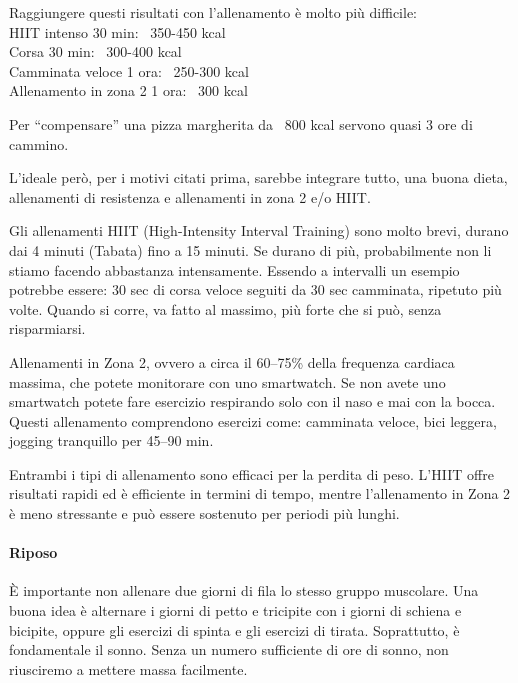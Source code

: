 \documentclass[12pt]{book} %
\begin{document}
Raggiungere questi risultati con l'allenamento è molto più difficile:\\
HIIT intenso 30 min: ~350-450 kcal\\
Corsa 30 min: ~300-400 kcal\\
Camminata veloce 1 ora: ~250-300 kcal\\
Allenamento in zona 2 1 ora: ~300 kcal

Per “compensare” una pizza margherita da ~800 kcal servono quasi 3 ore di cammino.

L'ideale però, per i motivi citati prima, sarebbe integrare tutto, una buona dieta, allenamenti di resistenza e allenamenti in zona 2 e/o HIIT.

Gli allenamenti HIIT (High-Intensity Interval Training) sono molto brevi, durano dai 4 minuti (Tabata) fino a 15 minuti. Se durano di più, probabilmente non li stiamo facendo abbastanza intensamente.
Essendo a intervalli un esempio potrebbe essere: 30 sec di corsa veloce seguiti da 30 sec camminata, ripetuto più volte. Quando si corre, va fatto al massimo, più forte che si può, senza risparmiarsi.

Allenamenti in Zona 2, ovvero a circa il 60–75\% della frequenza cardiaca massima, che potete monitorare con uno smartwatch. Se non avete uno smartwatch potete fare esercizio respirando solo con il naso e mai con la bocca. Questi allenamento comprendono esercizi come: camminata veloce, bici leggera, jogging tranquillo per 45–90 min.

Entrambi i tipi di allenamento sono efficaci per la perdita di peso. L'HIIT offre risultati rapidi ed è efficiente in termini di tempo, mentre l'allenamento in Zona 2 è meno stressante e può essere sostenuto per periodi più lunghi.

\paragraph{Riposo}
È importante non allenare due giorni di fila lo stesso gruppo muscolare. Una buona idea è alternare i giorni di petto e tricipite con i giorni di schiena e bicipite, oppure gli esercizi di spinta e gli esercizi di tirata.
Soprattutto, è fondamentale il sonno. Senza un numero sufficiente di ore di sonno, non riusciremo a mettere massa facilmente.
\end{document}
